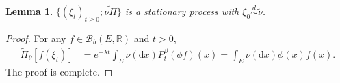\documentclass[12pt,a4paper]{amsart}
\numberwithin{equation}{section}
\theoremstyle{plain}
\newtheorem{lem}[thm]{Lemma}
\theoremstyle{definition}
\theoremstyle{remark}
\begin{document}
\begin{lem} \label{thm:E.15}
	$\{(\xi_t)_{t\geq 0}; \widetilde{\nu \Pi}\}$ is a stationary process with $\xi_0 \overset{d}\sim \widetilde \nu$.
\end{lem}
\begin{proof}
For any $f\in \mathcal{B}_b(E, \mathbb R)$ and $t>0$, 
\begin{align*}
\widetilde{\Pi}_{\bar\nu}[f(\xi_t)]&=e^{-\lambda t}\int_E\nu(\mathrm dx)P^\beta_t(\phi f)(x)
=\int_E\nu(\mathrm dx)\phi(x)f(x).
\end{align*}
The proof is complete.
\end{proof}
\end{document}
